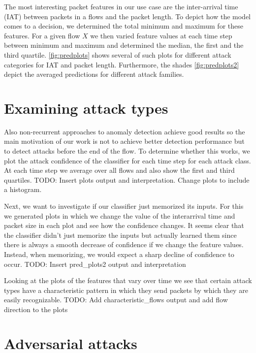 \documentclass[sigconf,nonacm]{acmart}
\newcommand\note[2]{{\color{#1}#2}}
\newcommand\todo[1]{{\note{red}{TODO: #1}}}
\begin{document}
The most interesting packet features in our use case are the inter-arrival time (IAT) between packets in a flows and the packet length. To depict how the model comes to a decision, we determined the total minimum and maximum for these features. For a given flow $X$ we then varied feature values at each time step between minimum and maximum and determined the median, the first and the third quartile. \autoref{fig:predplots} shows several of such plots for different attack categories for IAT and packet length. Furthermore, the shades \autoref{fig:predplots2} depict the averaged predictions for different attack families. 


\section{Examining attack types}

Also non-recurrent approaches to anomaly detection achieve good results so the main motivation of our work is not to achieve better detection performance but to detect attacks before the end of the flow. To determine whether this works, we plot the attack confidence of the classifier for each time step for each attack class. At each time step we average over all flows and also show the first and third quartiles. \todo{Insert plots output and interpretation. Change plots to include a histogram.}

Next, we want to investigate if our classifier just memorized its inputs. For this we generated plots in which we change the value of the interarrival time and packet size in each plot and see how the confidence changes. It seems clear that the classifier didn't just memorize the inputs but actually learned them since there is always a smooth decrease of confidence if we change the feature values. Instead, when memorizing, we would expect a sharp decline of confidence to occur. \todo{Insert pred\_plots2 output and interpretation}

Looking at the plots of the features that vary over time we see that certain attack types have a characteristic pattern in which they send packets by which they are easily recognizable. \todo{Add characteristic\_flows output and add flow direction to the plots}

\section{Adversarial attacks}
\end{document}
